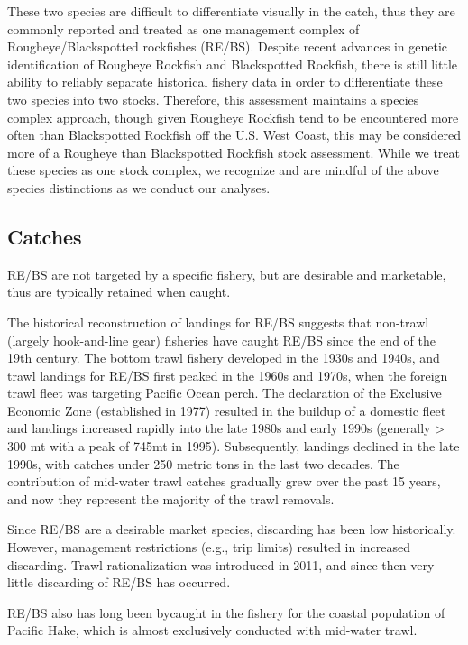 \documentclass[
]{scrartcl}
\begin{document}
These two species are difficult to differentiate visually in the catch,
thus they are commonly reported and treated as one management complex of
Rougheye/Blackspotted rockfishes (RE/BS). Despite recent advances in
genetic identification of Rougheye Rockfish and Blackspotted Rockfish,
there is still little ability to reliably separate historical fishery
data in order to differentiate these two species into two stocks.
Therefore, this assessment maintains a species complex approach, though
given Rougheye Rockfish tend to be encountered more often than
Blackspotted Rockfish off the U.S. West Coast, this may be considered
more of a Rougheye than Blackspotted Rockfish stock assessment. While we
treat these species as one stock complex, we recognize and are mindful
of the above species distinctions as we conduct our analyses.

\subsection*{Catches}\label{catches}

RE/BS are not targeted by a specific fishery, but are desirable and
marketable, thus are typically retained when caught.

The historical reconstruction of landings for RE/BS suggests that
non-trawl (largely hook-and-line gear) fisheries have caught RE/BS since
the end of the 19th century. The bottom trawl fishery developed in the
1930s and 1940s, and trawl landings for RE/BS first peaked in the 1960s
and 1970s, when the foreign trawl fleet was targeting Pacific Ocean
perch. The declaration of the Exclusive Economic Zone (established in
1977) resulted in the buildup of a domestic fleet and landings increased
rapidly into the late 1980s and early 1990s (generally \textgreater{}
300 mt with a peak of 745mt in 1995). Subsequently, landings declined in
the late 1990s, with catches under 250 metric tons in the last two
decades. The contribution of mid-water trawl catches gradually grew over
the past 15 years, and now they represent the majority of the trawl
removals.

Since RE/BS are a desirable market species, discarding has been low
historically. However, management restrictions (e.g., trip limits)
resulted in increased discarding. Trawl rationalization was introduced
in 2011, and since then very little discarding of RE/BS has occurred.

RE/BS also has long been bycaught in the fishery for the coastal
population of Pacific Hake, which is almost exclusively conducted with
mid-water trawl.
\end{document}
